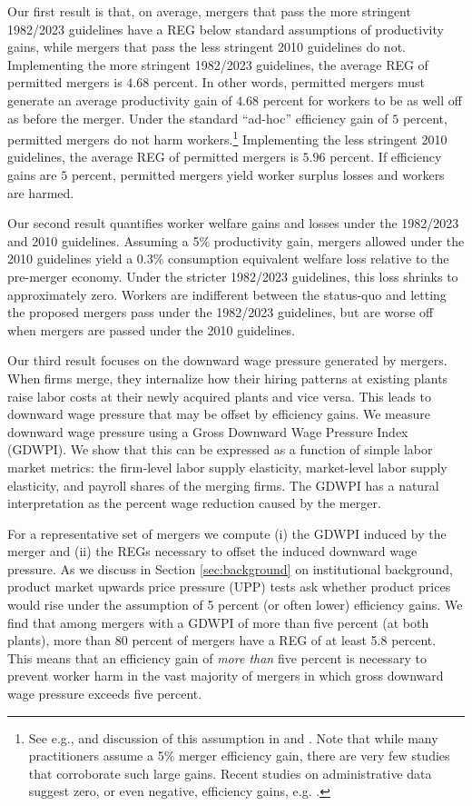 \documentclass[12pt]{article}
\theoremstyle{prop}
\begin{document}
Our first result is that, on average, mergers that pass the more stringent 1982/2023 guidelines have a REG below standard assumptions of productivity gains, while mergers that pass the less stringent 2010 guidelines do not. 
Implementing the more stringent 1982/2023 guidelines, the average REG of permitted mergers is $4.68$ percent. 
In other words, permitted mergers must generate an average productivity gain of $4.68$ percent for workers to be as well off as before the merger. 
Under the standard ``ad-hoc''  efficiency gain of $5$  percent, permitted mergers do not harm workers.\footnote{
    See e.g., \citet{ivaldi2005quantifying} and discussion of this assumption in \citet{bonnet2017empirical} and \citet{bonnet2020empirical}.
    Note that while many practitioners assume a 5\% merger efficiency gain, there are very few studies that corroborate such large gains. 
    Recent studies on administrative data suggest zero, or even negative, efficiency gains, e.g. \citet{blonigen2016evidence}.}  
Implementing the less stringent 2010 guidelines, the average REG of permitted mergers is $5.96$  percent. 
If efficiency gains are $5$  percent, permitted mergers yield worker surplus losses and workers are harmed. 

Our second result quantifies worker welfare gains and losses under the 1982/2023 and 2010 guidelines. 
Assuming a 5\% productivity gain,  mergers allowed under the 2010 guidelines yield a 0.3\% consumption equivalent welfare loss relative to the pre-merger economy. 
Under the stricter 1982/2023 guidelines, this loss shrinks to approximately zero.
Workers are indifferent between the status-quo and letting the proposed mergers pass under the 1982/2023 guidelines, but are worse off when mergers are passed under the 2010 guidelines. 

Our third result focuses on the downward wage pressure generated by mergers. 
When firms merge, they internalize how their hiring patterns at existing plants raise labor costs at their newly acquired plants and vice versa. 
This leads to downward wage pressure that may be offset by efficiency gains.  
We measure downward wage pressure using a Gross Downward Wage Pressure Index (GDWPI). 
We show that this can be expressed as a function of simple labor market metrics: the firm-level labor supply elasticity, market-level labor supply elasticity, and payroll shares of the merging firms. 
The GDWPI has a natural interpretation as the percent wage reduction caused by the merger. 

For a representative set of mergers we compute (i) the GDWPI induced by the merger and (ii) the REGs necessary to offset the induced downward wage pressure.   
As we discuss in Section \ref{sec:background} on institutional background, product market upwards price pressure (UPP) tests \citep[e.g.][]{farrell2010antitrust} ask whether product prices would rise under the assumption of 5 percent (or often lower) efficiency gains. 
We find that among mergers with a GDWPI of more than five percent (at both plants), more than 80 percent of mergers have a REG of at least 5.8 percent. 
This means that an efficiency gain of \textit{more than} five percent is necessary to prevent worker harm in the vast majority of mergers in which gross downward wage pressure exceeds five percent.  
\end{document}
